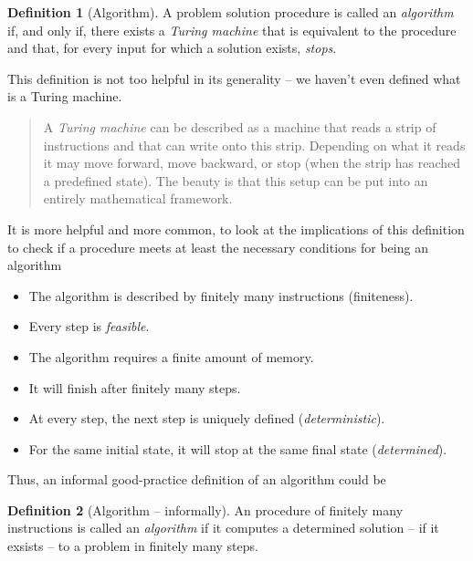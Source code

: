 \documentclass[
]{book}
\providecommand{\tightlist}{%
  \setlength{\itemsep}{0pt}\setlength{\parskip}{0pt}}
\newenvironment {JHSAYS} [0] {\begin{quote}\color{jhsc}} {\end{quote}}
\theoremstyle{definition}
\newtheorem{definition}{Definition}[chapter]
\theoremstyle{definition}
\theoremstyle{definition}
\theoremstyle{definition}
\theoremstyle{remark}
\begin{document}
\begin{definition}[Algorithm]
\protect\hypertarget{def:algorithm}{}\label{def:algorithm}A problem solution procedure is called an \emph{algorithm} if, and only if, there exists a \emph{Turing machine} that is equivalent to the procedure and that, for every input for which a solution exists, \emph{stops}.
\end{definition}

This definition is not too helpful in its generality -- we haven't even defined what is a Turing machine.

\leavevmode\hypertarget{rem-coors}{}%
\begin{JHSAYS}
A \emph{Turing machine} can be described as a machine that reads a strip of instructions and that can write onto this strip. Depending on what it reads it may move forward, move backward, or stop (when the strip has reached a predefined state). The beauty is that this setup can be put into an entirely mathematical framework.

\end{JHSAYS}

It is more helpful and more common, to look at the implications of this definition to check if a procedure meets at least the necessary conditions for being an algorithm

\begin{itemize}
\tightlist
\item
  The algorithm is described by finitely many instructions (finiteness).
\item
  Every step is \emph{feasible}.
\item
  The algorithm requires a finite amount of memory.
\item
  It will finish after finitely many steps.
\item
  At every step, the next step is uniquely defined (\emph{deterministic}).
\item
  For the same initial state, it will stop at the same final state (\emph{determined}).
\end{itemize}

Thus, an informal good-practice definition of an algorithm could be

\begin{definition}[Algorithm -- informally]
\protect\hypertarget{def:info-algorithm}{}\label{def:info-algorithm}An procedure of finitely many instructions is called an \emph{algorithm} if it computes a determined solution -- if it exsists -- to a problem in finitely many steps.
\end{definition}
\end{document}
